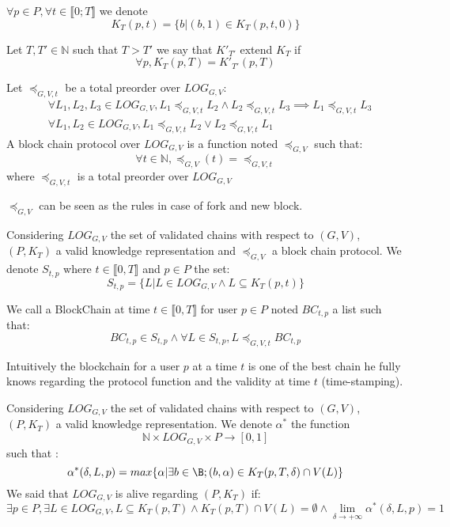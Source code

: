 \begin{mynota}
	$\forall p \in P, \forall t\in \llbracket 0;T \rrbracket$ we denote $$K_{T}(p,t)=\{b | (b,1) \in K_{T}(p,t,0)\}$$
\end{mynota}

\begin{mydef}
	Let $T,T' \in \mathbb{N}$ such that $T>T'$ we say that $K'_{T'}$ extend $K_{T}$ if $$\forall p, K_{T}(p,T) = K'_{T'}(p,T)$$
\end{mydef}

\begin{mydef}
	Let $\preceq_{G,V,t}$ be  a total preorder over $LOG_{G,V}$:
\begin{eqnarray*}		
	&\forall L_1, L_2, L_3 \in LOG_{G,V}, L_1 \preceq_{G,V,t} L_2 \land L_2 \preceq_{G,V,t} L_3 \implies L_1 \preceq_{G,V,t} L_3  \\
	&\forall L_1, L_2 \in LOG_{G,V}, L_1 \preceq_{G,V,t} L_2 \lor L_2 \preceq_{G,V,t} L_1 
\end{eqnarray*}
	A block chain protocol over $LOG_{G,V}$ is a function noted $\preceq_{G,V}$ such that: $$ \forall t \in \mathbb{N}, \preceq_{G,V}(t) =  \preceq_{G,V,t}$$ where $\preceq_{G,V,t}$ is a total preorder over $LOG_{G,V}$
\end{mydef}
\begin{myrem}
	$\preceq_{G,V}$ can be seen as the rules in case of fork and new block. 
\end{myrem}

\begin{mydef}
	Considering $LOG_{G,V}$ the set of validated chains with respect to $(G,V)$, $(P,K_T)$ a valid knowledge representation and $\preceq_{G,V}$ a block chain protocol. We denote $S_{t,p}$ where $t\in \llbracket0,T\rrbracket$ and $p\in P$ the set:
	$$ S_{t,p} = \{L | L \in LOG_{G,V} \land  L \subseteq K_T(p,t)\} $$
	
	We call a BlockChain at time $t\in \llbracket0,T\rrbracket$ for user $p \in P$ noted $BC_{t,p}$ a list such that:
	$$BC_{t,p} \in S_{t,p} \land \forall L \in S_{t,p}, L \preceq_{G,V,t} BC_{t,p} $$
	
\end{mydef}
\begin{myrem}
	Intuitively the blockchain for a user $p$ at a time $t$ is one of the best chain he fully knows regarding the protocol function and the validity at time $t$ (time-stamping).
\end{myrem}

\begin{mydef}
	Considering $LOG_{G,V}$ the set of validated chains with respect to $(G,V)$, $(P,K_T)$ a valid knowledge representation.
	We denote $\alpha^*$ the function $$ \mathbb{N} \times LOG_{G,V} \times P \rightarrow [0,1]$$ such that : 
	$$\alpha^*(\delta,L,p) = max\{\alpha | \exists b \in \B; (b,\alpha) \in K_T(p,T,\delta)\cap V(L)\} $$
	We said that $LOG_{G,V}$ is alive regarding $(P,K_T)$ if:
	$$\exists p \in P, \exists L \in LOG_{G,V}, L \subseteq K_T(p,T) \land K_T(p,T) \cap V(L) = \emptyset \land \lim\limits_{\delta\rightarrow +\infty} \alpha^*(\delta,L,p) = 1$$
\end{mydef}




